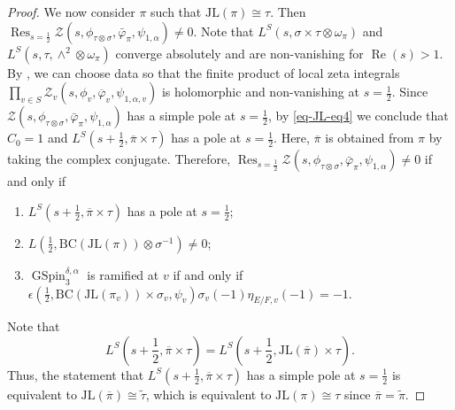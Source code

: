\documentclass[12pt]{amsart}
\renewcommand{\Re}{\operatorname{Re}}
\newcommand{\Res}{\operatorname{Res}}
\newcommand{\wt}{\widetilde}
\newcommand{\JL}{\mathrm{JL}}
\newcommand{\BC}{\mathrm{BC}}
\theoremstyle{remark}
\DeclareMathOperator{\GSpin}{GSpin}
\begin{document}
\begin{proof}
We now consider $\pi$ such that $\JL(\pi)\cong \tau$. Then
$\Res_{s=\frac{1}{2}}\mathcal{Z}(s,\phi_{\tau\otimes\sigma},\bar{\varphi}_{\pi},\psi_{1,\alpha})\not=0$.
Note that $L^S(s, \sigma\times \tau\otimes\omega_\pi)$ and $L^S(s, \tau, \wedge^2\otimes\omega_\pi)$ converge absolutely and are non-vanishing for $\Re(s)>1$. 
By \cite{Yan2025GGP}, we can choose data so that the finite product of local zeta integrals $\prod_{v\in S}\mathcal{Z}_v (s, \phi_v, \overline{\varphi}_v,\psi_{1,\alpha,v})$ is holomorphic and non-vanishing at $s=\frac{1}{2}$.
Since  $\mathcal{Z}(s,\phi_{\tau\otimes\sigma},\bar{\varphi}_{\pi},\psi_{1,\alpha})$ has a simple pole at $s=\frac{1}{2}$, by \eqref{eq-JL-eq4} we conclude that $C_0=1$ and $L^S(s+\frac{1}{2},\overline{\pi}\times\tau)$ has a pole at $s=\frac{1}{2}$. Here, $\overline{\pi}$ is obtained from $\pi$ by taking the complex conjugate.  
Therefore, $\Res_{s=\frac{1}{2}}\mathcal{Z}(s,\phi_{\tau\otimes\sigma},\bar{\varphi}_{\pi},\psi_{1,\alpha})\not=0$ if and only if
\begin{enumerate}
\item[(i)] $L^{S}(s+\frac{1}{2},\overline{\pi}\times \tau)$ has a pole at $s=\frac{1}{2}$;
\item[(ii)] $L(\frac{1}{2}, \BC(\JL(\pi))\otimes\sigma^{-1})\not=0$;
\item[(iii)] $\GSpin_3^{\delta, \alpha}$ is ramified at $v$ if and only if  
$\epsilon(\frac{1}{2}, \BC( \JL(\pi_v))\times \sigma_v, \psi_v) \sigma_v(-1) \eta_{E/F,v}(-1)=-1.$
\end{enumerate}

Note that 
\begin{equation*}
L^S(s+\frac{1}{2},\overline{\pi}\times\tau)=L^S(s+\frac{1}{2}, \JL(\overline{\pi})\times\tau). 	
\end{equation*}
Thus, the statement that $L^{S}(s+\frac{1}{2},\overline{\pi}\times \tau)$ has a simple pole at $s=\frac{1}{2}$ is equivalent to $\JL(\overline{\pi})\cong\wt \tau$, which is equivalent to $\JL(\pi)\cong \tau$ since $\overline{\pi}=\wt \pi$.  



\end{proof}
\end{document}
